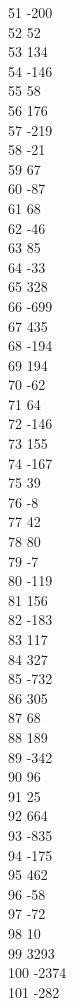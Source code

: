 { 51	-200 \\
 52	52 \\
 53	134 \\
 54	-146 \\
 55	58 \\
 56	176 \\
 57	-219 \\
 58	-21 \\
 59	67 \\
 60	-87 \\
 61	68 \\
 62	-46 \\
 63	85 \\
 64	-33 \\
 65	328 \\
 66	-699 \\
 67	435 \\
 68	-194 \\
 69	194 \\
 70	-62 \\
 71	64 \\
 72	-146 \\
 73	155 \\
 74	-167 \\
 75	39 \\
 76	-8 \\
 77	42 \\
 78	80 \\
 79	-7 \\
 80	-119 \\
 81	156 \\
 82	-183 \\
 83	117 \\
 84	327 \\
 85	-732 \\
 86	305 \\
 87	68 \\
 88	189 \\
 89	-342 \\
 90	96 \\
 91	25 \\
 92	664 \\
 93	-835 \\
 94	-175 \\
 95	462 \\
 96	-58 \\
 97	-72 \\
 98	10 \\
 99	3293 \\
 100	-2374 \\
 101	-282 \\
}
